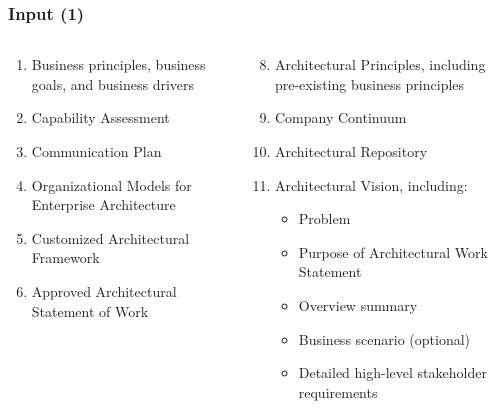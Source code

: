 \documentclass[aspectratio=169, table]{beamer}
\begin{document}
    \begin{frame}
        \frametitle{Input (1)}
        \begin{columns}
            \begin{column}{0.5\textwidth}
                \begin{center}
                    \begin{enumerate}

                        \item Business principles, business goals, and business drivers
                        \item Capability Assessment
                        \item Communication Plan
                        \item Organizational Models for Enterprise Architecture
                        \item Customized Architectural Framework
                        \item Approved Architectural Statement of Work

                    \end{enumerate}
                \end{center}
            \end{column}
            \begin{column}{0.5\textwidth}
                \begin{center}
                    \begin{enumerate}
                        \setcounter{enumi}{7}
                        \item Architectural Principles, including pre-existing business principles
                        \item Company Continuum
                        \item Architectural Repository
                        \item Architectural Vision, including:
                        \begin{itemize}
                            \item Problem
                            \item Purpose of Architectural Work Statement
                            \item Overview summary
                            \item Business scenario (optional)
                            \item Detailed high-level stakeholder requirements
                        \end{itemize}

                    \end{enumerate}
                \end{center}
            \end{column}
        \end{columns}
    \end{frame}
\end{document}
